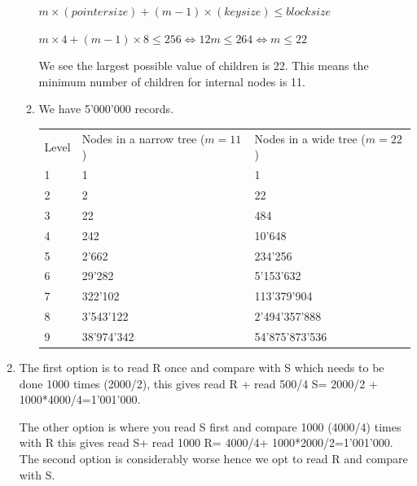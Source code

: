 \documentclass[12pt]{extarticle}
\begin{document}
\begin{flushleft}
\begin{enumerate}[label=\textbf{\Alph*.}]
\begin{enumerate}[label=\arabic*)]
$ m \times (pointer size) + (m-1) \times (key size)\leq block size$

$m \times 4+ (m-1) \times 8 \leq 256 \Leftrightarrow 12m\leq264\Leftrightarrow m\leq 22$

We see the largest possible value of children is 22. This means the minimum number of children for internal nodes is 11. 
\item 
We have 5'000'000 records. 

\begin{tabular}{lll}

Level & Nodes in a narrow tree (\(m=11\))& Nodes in a wide tree (\(m=22\))\\

1     & 1          & 1          \\
2     & 2          & 22         \\
3     & 22         & 484        \\
4     & 242        & 10'648     \\
5     & 2'662      & 234'256    \\
6     & 29'282     & 5'153'632\\
7     & 322'102    & 113'379'904\\
8     & 3'543'122  & 2'494'357'888\\
9	& 38'974'342&54'875'873'536\\

\end{tabular}


\end{enumerate}

\item The first option is to read R once and compare with S which needs to be done 1000 times (2000/2), this gives read R + read 500/4 S= 2000/2 + 1000*4000/4=1'001'000.

The other option is where you read S first and compare 1000 (4000/4) times with R  this gives read S+ read 1000 R= 4000/4+ 1000*2000/2=1'001'000. The second option is considerably worse hence we opt to read R and compare with S.
\end{enumerate}
\end{flushleft}
\end{document}
